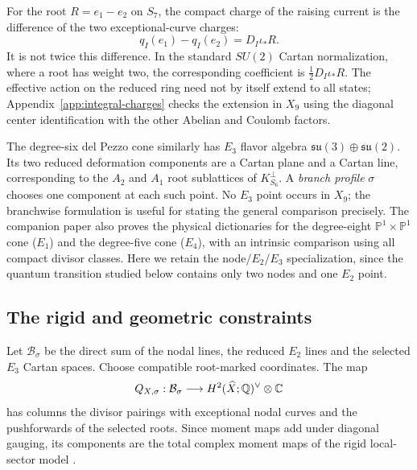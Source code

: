 For the root $R=e_1-e_2$ on $S_7$, the compact charge of the
raising current is the difference of the two exceptional-curve
charges:
\begin{equation}
 q_I(e_1)-q_I(e_2)=D_I\iota_*R.
 \label{eq:e2-charge-difference}
\end{equation}
It is not twice this difference. In the standard $SU(2)$ Cartan
normalization, where a root has weight two, the corresponding
coefficient is $\tfrac12D_I\iota_*R$. The effective action on
the reduced ring need not by itself extend to all states;
Appendix~\ref{app:integral-charges} checks the extension in $X_9$
using the diagonal center identification with the other Abelian
and Coulomb factors.

The degree-six del Pezzo cone similarly has $E_3$ flavor algebra
$\mathfrak{su}(3)\oplus\mathfrak{su}(2)$. Its two reduced
deformation components are a Cartan plane and a Cartan line,
corresponding to the $A_2$ and $A_1$ root sublattices of
$K_{S_6}^\perp$. A \emph{branch profile} $\sigma$ chooses one
component at each such point. No $E_3$ point occurs in $X_9$;
the branchwise formulation is useful for stating the general
comparison precisely.
The companion paper \cite[Sections~2--4]{wuebben2026globalconstraints} also proves
the physical dictionaries for the degree-eight $\mathbb P^1\times\mathbb P^1$
cone ($E_1$) and the degree-five cone ($E_4$), with an intrinsic
comparison using all compact divisor classes. Here we retain the
node/$E_2$/$E_3$ specialization, since the quantum transition studied
below contains only two nodes and one $E_2$ point.

\subsection{The rigid and geometric constraints}

Let $\mathcal B_\sigma$ be the direct sum of the nodal lines,
the reduced $E_2$ lines and the selected $E_3$ Cartan spaces.
Choose compatible root-marked coordinates. The map
\begin{equation}
 Q_{X,\sigma}:\mathcal B_\sigma\longrightarrow
 H^2(\widehat X;\mathbb Q)^\vee\otimes\mathbb C
 \label{eq:compact-charge-map}
\end{equation}
has columns the divisor pairings with exceptional nodal curves
and the pushforwards of the selected roots. Since moment maps
add under diagonal gauging, its components are the total complex
moment maps of the rigid local-sector model
\cite{Ceresole:2000}.

